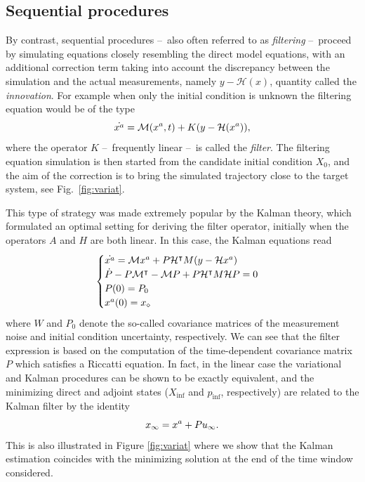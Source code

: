 \subsection{Sequential procedures}

By contrast, sequential procedures --~also often referred to as \emph{filtering} --~proceed by simulating equations closely resembling the direct model equations, with an additional correction term taking into account the discrepancy between the simulation and the actual measurements, namely $y-\mathcal{H}(x)$, quantity called the \emph{innovation}. For example when only the initial condition is unknown the filtering equation would be of the type
\begin{equation}\label{eq:filterNotation}
	\dot{x^a} = \mathcal{M}(x^a,t) + K(y-\mathcal{H}(x^a)),
\end{equation}
where the operator $K$ --~frequently linear --~is called the \emph{filter}. The filtering equation simulation is then started from the candidate initial condition $X_0$, and the aim of the correction is to bring the simulated trajectory close to the target system, see Fig.~\ref{fig:variat}.

This type of strategy was made extremely popular by the Kalman theory, which formulated an optimal setting for deriving the filter operator, initially when the operators $A$ and $H$ are both linear. In this case, the Kalman equations read
\begin{equation}\label{eq:Kalman}
	\begin{cases}
		\dot{x^a} = \mathcal{M}x^a + P\mathcal{H}^\intercal M (y-\mathcal{H}x^a)\\
		\dot{P} - P\mathcal{M}^\intercal - \mathcal{M}P + P\mathcal{H}^\intercal M \mathcal{H}P = 0\\
		P(0)=P_{0}\\
		x^a(0) = x_\diamond
	\end{cases}
\end{equation}
where $W$ and $P_0$ denote the  so-called covariance matrices of the measurement noise and initial condition uncertainty, respectively. We can see that the filter expression is based on the computation of the time-dependent covariance matrix $P$ which satisfies a Riccatti equation. In fact, in the linear case the variational and Kalman procedures can be shown to be exactly equivalent, and the minimizing direct and adjoint states ($X_\text{inf}$ and $p_\text{inf}$, respectively) are related to the Kalman filter by the identity \cite{Bensoussan71}
\[
	x_\infty = x^a + P u_\infty.
\]
This is also illustrated in Figure \ref{fig:variat} where we show that the Kalman estimation coincides with the minimizing solution at the end of the time window considered.

